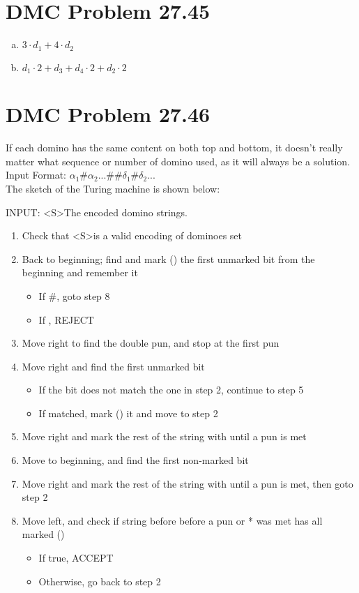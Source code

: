 \documentclass{article}
\def\math#1{$#1$}
\newcommand{\cmark}{\text{\ding{51}}}
\newcommand{\xmark}{\text{\ding{55}}}
\begin{document}
\section{DMC Problem 27.45}
\begin{enumerate}[a)]
    \item \math{3 \cdot d_1 + 4 \cdot d_2}
    \item \math{d_1 \cdot 2 + d_3 + d_4 \cdot 2 + d_2 \cdot 2}
\end{enumerate}

\section{DMC Problem 27.46}
If each domino has the same content on both top and bottom, it doesn't really matter what sequence or number of domino used, as it will always be a solution. \\
Input Format: \math{\alpha_1\#\alpha_2...\#\#\delta_1\#\delta_2...} \\
The sketch of the Turing machine is shown below:

INPUT: \textless S\textgreater The encoded domino strings.
\begin{enumerate}
    \item Check that \textless S\textgreater is a valid encoding of dominoes set
    \item Back to beginning; find and mark (\cmark) the first unmarked bit from the beginning and remember it
        \begin{itemize}
            \item If \#, goto step 8
            \item If \textvisiblespace, REJECT
        \end{itemize}
    \item Move right to find the double pun, and stop at the first pun
    \item Move right and find the first unmarked bit
        \begin{itemize}
            \item If the bit does not match the one in step 2, continue to step 5
            \item If matched, mark (\cmark) it and move to step 2
        \end{itemize}
    \item Move right and mark the rest of the string with \xmark until a pun is met
    \item Move to beginning, and find the first non-marked bit
    \item Move right and mark the rest of the string with \xmark until a pun is met, then goto step 2
    \item Move left, and check if string before before a pun or * was met has all marked (\cmark)
        \begin{itemize}
            \item If true, ACCEPT
            \item Otherwise, go back to step 2
        \end{itemize}
\end{enumerate}
\end{document}
